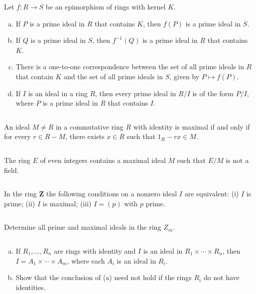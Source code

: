 \begin{ex}
    Let $f:R\to S$ be an epimorphism of rings with kernel $K$.
    \begin{enumerate}[(a)]
        \item If $P$ is a prime ideal in $R$ that contains $K$, then $f(P)$ is a prime ideal in $S$.
        \item If $Q$ is a prime ideal in $S$, then $f^{-1}(Q)$ is a prime ideal in $R$ that contains $K$.
        \item There is a one-to-one correspondence between the set of all prime ideals in $R$ that contain $K$ and the set of all prime ideals in $S$, given by $P\mapsto f(P)$.
        \item If $I$ is an ideal in a ring $R$, then every prime ideal in $R /I$ is of the form $P /I$, where $P$ is a prime ideal in $R$ that contains $I$.
    \end{enumerate}
\end{ex}

$$ $$

\begin{ex}
    An ideal $M\neq R$ in a commutative ring $R$ with identity is maximal if and only if for every $r\in R-M$, there exists $x\in R$ such that $1_{R}-rx\in M$.
\end{ex}

$$ $$

\begin{ex}
    The ring $E$ of even integers contains a maximal ideal $M$ such that $E /M$ is not a field.
\end{ex}

$$ $$

\begin{ex}
    In the ring $\mathbf{Z}$ the following conditions on a nonzero ideal $I$ are equivalent: (i) $I$ is prime; (ii) $I$ is maximal; (iii) $I=(p)$ with $p$ prime.    
\end{ex}

$$ $$

\begin{ex}
    Determine all prime and maximal ideals in the ring $Z_{m}$.
\end{ex}

$$ $$

\begin{ex}
    \begin{enumerate}[(a)]
        \item If $R_{1},\dots, R_{n}$ are rings with identity and $I$ is an ideal in $R_{1}\times \cdots\times R_{n}$, then $I=A_{1}\times \cdots\times A_{m}$, where each $A_{i}$ is an ideal in $R_{i}$.
        \item Show that the conclusion of (a) need not hold if the rings $R_{i}$ do not have identities.
    \end{enumerate}
\end{ex}

